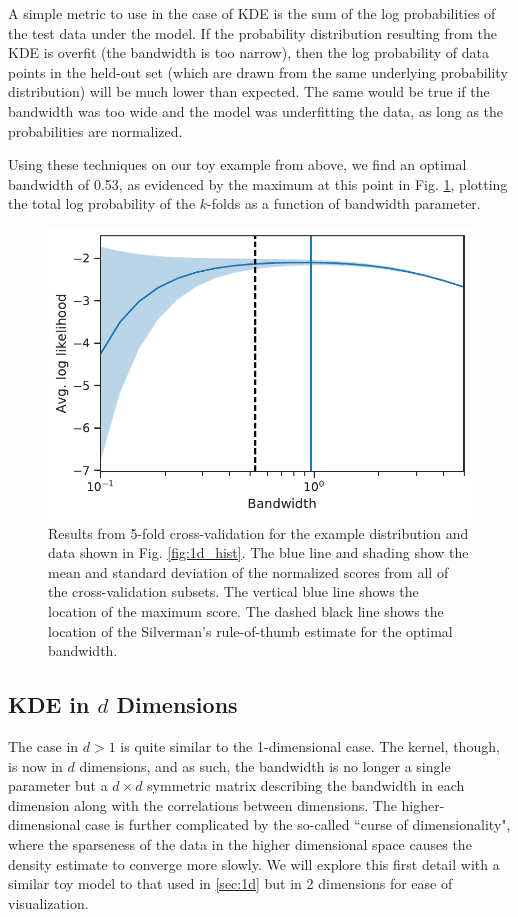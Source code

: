 A simple metric to use in the case of KDE is the sum of the log probabilities of the test data under the model. If the probability distribution resulting from the KDE is overfit (the bandwidth is too narrow), then the log probability of data points in the held-out set (which are drawn from the same underlying probability distribution) will be much lower than expected. The same would be true if the bandwidth was too wide and the model was underfitting the data, as long as the probabilities are normalized.

Using these techniques on our toy example from above, we find an optimal bandwidth of 0.53, as evidenced by the maximum at this point in Fig. \ref{fig:1d_bandwidth_opt}, plotting the total log probability of the $k$-folds as a function of bandwidth parameter.

\begin{figure}
    \centering
    \includegraphics{figures/snemo_kde/1d_bandwidth_example.pdf}
    \caption{Results from 5-fold cross-validation for the example distribution and data shown in Fig. \ref{fig:1d_hist}. The blue line and shading show the mean and standard deviation of the normalized scores from all of the cross-validation subsets. The vertical blue line shows the location of the maximum score. The dashed black line shows the location of the Silverman's rule-of-thumb estimate for the optimal bandwidth.}
    \label{fig:1d_bandwidth_opt}
\end{figure}

\subsection[KDE in d Dimensions]{KDE in $d$ Dimensions}
The case in $d>1$ is quite similar to the 1-dimensional case. The kernel, though, is now in $d$ dimensions, and as such, the bandwidth is no longer a single parameter but a $d\times d$ symmetric matrix describing the bandwidth in each dimension along with the correlations between dimensions. The higher-dimensional case is further complicated by the so-called ``curse of dimensionality", where the sparseness of the data in the higher dimensional space causes the density estimate to converge more slowly. We will explore this first detail with a similar toy model to that used in \ref{sec:1d} but in 2 dimensions for ease of visualization.

